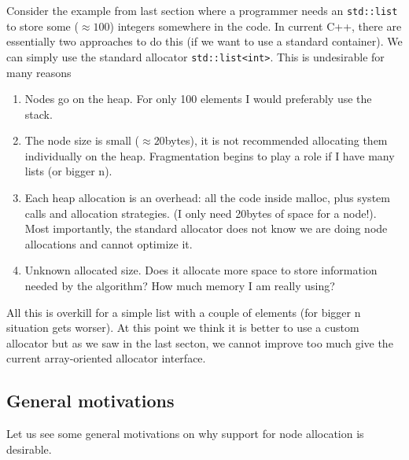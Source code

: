 \documentclass[11pt]{article}
\begin{document}
Consider the example from last section where a programmer needs an
\texttt{std::list} to store some ($\approx 100$) integers somewhere
in the code. In current C++, there are essentially two approaches to
do this (if we want to use a standard container). We can simply use
the standard allocator
\texttt{std::list<int>}.  This is undesirable for many reasons
\begin{enumerate}

\item Nodes go on the heap. For only 100 elements I would preferably
use the stack.

\item The node size is small ($\approx 20$bytes), it is not recommended
allocating them individually on the heap. Fragmentation begins to play a role
if I have many lists (or bigger n).

\item  Each heap allocation is an overhead: all the code inside malloc, plus
system calls and allocation strategies. (I only need 20bytes of space for a
node!). Most importantly, the standard allocator does not
know we are doing node allocations and cannot optimize it.

\item Unknown allocated size. Does it allocate more space to store information
needed by the algorithm? How much memory I am really using?

\end{enumerate}

All this is overkill for a simple list with a couple of elements
(for bigger n situation gets worser). At this point we think it is
better to use a custom allocator but as we saw in the last secton,
we cannot improve too much give the current array-oriented allocator
interface.

\subsection{General motivations}

Let us see some general motivations on why support for node allocation is
desirable.
\end{document}
